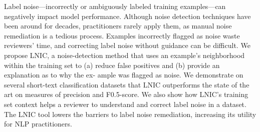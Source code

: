 Label noise—incorrectly or ambiguously labeled training examples—can negatively impact model performance. Although noise detection techniques have been around for decades, practitioners rarely apply them, as manual noise remediation is a tedious process. Examples incorrectly flagged as noise waste reviewers' time, and correcting label noise without guidance can be difficult. We propose LNIC, a noise-detection method that uses an example's neighborhood within the training set to (a) reduce false positives and (b) provide an explanation as to why the ex- ample was flagged as noise. We demonstrate on several short-text classification datasets that LNIC outperforms the state of the art on measures of precision and F0.5-score. We also show how LNIC's training set context helps a reviewer to understand and correct label noise in a dataset. The LNIC tool lowers the barriers to label noise remediation, increasing its utility for NLP practitioners.
